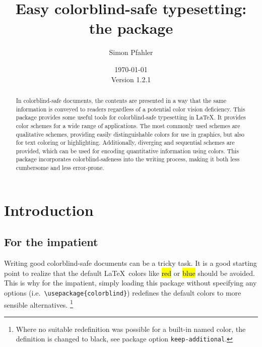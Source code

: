 \documentclass{scrartcl}
\title{Easy colorblind-safe typesetting:\\ the \colorblind package}
\author{Simon Pfahler}
\date{\today\\Version 1.2.1}
\newcommand\hlc[2][T-Q-PH4]{{%
    \colorlet{foo}{#1}%
    \sethlcolor{foo}\hl{#2}}%
}
\newcommand\tbs{\textbackslash}
\newcommand\cs[1]{\texttt{\tbs#1}}
\begin{document}
\maketitle

\begin{abstract}
	In colorblind-safe documents, the contents are presented in a way that the same information is conveyed to readers regardless of a potential color vision deficiency.
	This package provides some useful tools for colorblind-safe typesetting in \LaTeX.
	It provides color schemes for a wide range of applications.
	The most commonly used schemes are qualitative schemes, providing easily distinguishable colors for use in graphics, but also for text coloring or highlighting.
	Additionally, diverging and sequential schemes are provided, which can be used for encoding quantitative information using colors.
	This package incorporates colorblind-safeness into the writing process, making it both less cumbersome and less error-prone.
\end{abstract}

\tableofcontents
\clearpage

\section{Introduction}
\subsection{For the impatient}
Writing good colorblind-safe documents can be a tricky task.
It is a good starting point to realize that the default \LaTeX\ colors like \hlc[red]{red} or \hlc[blue]{blue} should be avoided.
This is why for the impatient, simply loading this package without specifying any options (i.e.\ \cs{usepackage\{colorblind\}}) redefines the default colors to more sensible alternatives.
\footnote{Where no suitable redefinition was possible for a built-in named color, the definition is changed to black, see package option \texttt{keep-additional}.}
\end{document}
